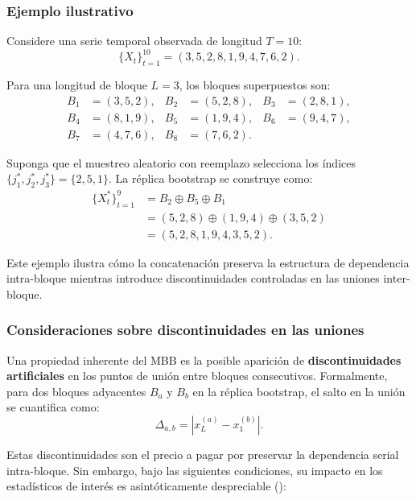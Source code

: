 \documentclass[
  spanish,
  us-letterpaper,
]{scrreprt}
\numberwithin{equation}{section}
\begin{document}
\subsubsection{Ejemplo ilustrativo}\label{ejemplo-ilustrativo}

Considere una serie temporal observada de longitud \(T = 10\): \[
\{X_t\}_{t=1}^{10} = (3, 5, 2, 8, 1, 9, 4, 7, 6, 2).
\]

Para una longitud de bloque \(L = 3\), los bloques superpuestos son: \[
\begin{aligned}
B_1 &= (3, 5, 2), & B_2 &= (5, 2, 8), & B_3 &= (2, 8, 1), \\
B_4 &= (8, 1, 9), & B_5 &= (1, 9, 4), & B_6 &= (9, 4, 7), \\
B_7 &= (4, 7, 6), & B_8 &= (7, 6, 2).
\end{aligned}
\]

Suponga que el muestreo aleatorio con reemplazo selecciona los índices
\(\{j_1^*, j_2^*, j_3^*\} = \{2, 5, 1\}\). La réplica bootstrap se
construye como: \[
\begin{aligned}
\{X_t^*\}_{t=1}^{9} &= B_2 \oplus B_5 \oplus B_1 \\
&= (5, 2, 8) \oplus (1, 9, 4) \oplus (3, 5, 2) \\
&= (5, 2, 8, 1, 9, 4, 3, 5, 2).
\end{aligned}
\]

Este ejemplo ilustra cómo la concatenación preserva la estructura de
dependencia intra-bloque mientras introduce discontinuidades controladas
en las uniones inter-bloque.

\subsubsection{Consideraciones sobre discontinuidades en las
uniones}\label{consideraciones-sobre-discontinuidades-en-las-uniones}

Una propiedad inherente del MBB es la posible aparición de
\textbf{discontinuidades artificiales} en los puntos de unión entre
bloques consecutivos. Formalmente, para dos bloques adyacentes \(B_a\) y
\(B_b\) en la réplica bootstrap, el salto en la unión se cuantifica
como: \[
\Delta_{a,b} = \left| x_L^{(a)} - x_1^{(b)} \right|.
\]

Estas discontinuidades son el precio a pagar por preservar la
dependencia serial intra-bloque. Sin embargo, bajo las siguientes
condiciones, su impacto en los estadísticos de interés es
asintóticamente despreciable ():
\end{document}
